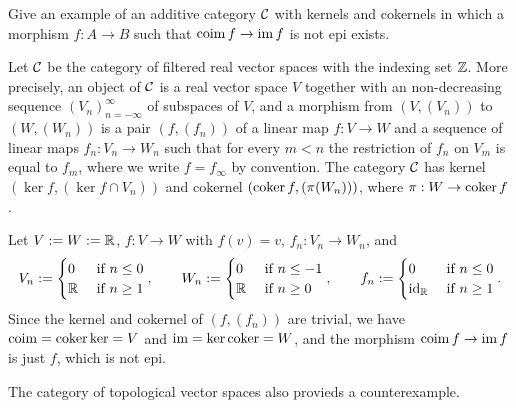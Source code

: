 \documentclass{../../../small}
\begin{document}
\begin{prb}
Give an example of an additive category $\mathcal{C}$ with kernels and cokernels in which a morphism $f:A\to B$ such that $\operatorname{coim}f\to\operatorname{im} f$ is not epi exists.
\end{prb}
\begin{sol}
Let $\mathcal{C}$ be the category of filtered real vector spaces with the indexing set $\mathbb{Z}$.
More precisely, an object of $\mathcal{C}$ is a real vector space $V$ together with an non-decreasing sequence $(V_n)_{n=-\infty}^\infty$ of subspaces of $V$, and a morphism from $(V,(V_n))$ to $(W,(W_n))$ is a pair $(f,(f_n))$ of a linear map $f:V\to W$ and a sequence of linear maps $f_n:V_n\to W_n$ such that for every $m<n$ the restriction of $f_n$ on $V_m$ is equal to $f_m$, where we write $f=f_\infty$ by convention.
The category $\mathcal{C}$ has kernel $(\ker f,(\ker f\cap V_n))$ and cokernel $(\operatorname{coker} f,(\pi(W_n)))$, where $\pi:W\to\operatorname{coker} f$.

Let $V:=W:=\mathbb{R}$, $f:V\to W$ with $f(v)=v$, $f_n:V_n\to W_n$, and
\[V_n:=\begin{cases}0&\text{ if }n\le0\\\mathbb{R}&\text{ if }n\ge1\end{cases},\qquad W_n:=\begin{cases}0&\text{ if }n\le-1\\\mathbb{R}&\text{ if }n\ge0\end{cases},\qquad f_n:=\begin{cases}0&\text{ if }n\le0\\\operatorname{id}_{\mathbb{R}}&\text{ if }n\ge1\end{cases}.\]
Since the kernel and cokernel of $(f,(f_n))$ are trivial, we have $\operatorname{coim}=\operatorname{coker}\ker=V$ and $\operatorname{im}=\ker\operatorname{coker}=W$, and the morphism $\operatorname{coim}f\to\operatorname{im} f$ is just $f$, which is not epi.

The category of topological vector spaces also provieds a counterexample.
\end{sol}
\end{document}
